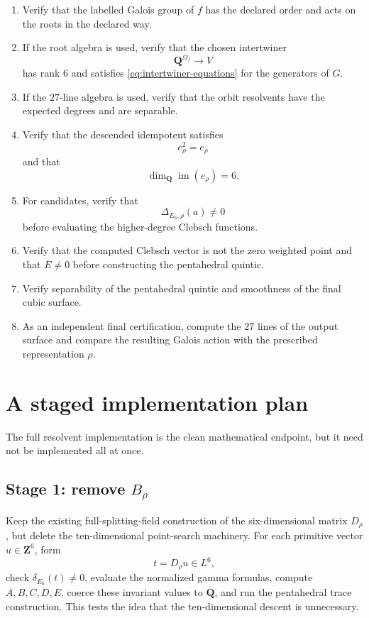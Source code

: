 \documentclass[11pt]{article}
\newcommand{\QQ}{\mathbf{Q}}
\newcommand{\ZZ}{\mathbf{Z}}
\newcommand{\im}{\operatorname{im}}
\newcommand{\deltaE}{\delta_{E_6}}
\begin{document}
\begin{enumerate}
\item Verify that the labelled Galois group of $f$ has the declared order and acts
on the roots in the declared way.

\item If the root algebra is used, verify that the chosen intertwiner
\[
  \QQ^{\Omega_f}\to V
\]
has rank $6$ and satisfies \eqref{eq:intertwiner-equations} for the generators of
$G$.

\item If the $27$-line algebra is used, verify that the orbit resolvents have the
expected degrees and are separable.

\item Verify that the descended idempotent satisfies
\[
  e_\rho^2=e_\rho
\]
and that
\[
  \dim_\QQ\im(e_\rho)=6.
\]

\item For candidates, verify that
\[
  \Delta_{E_6,\rho}(a)\neq0
\]
before evaluating the higher-degree Clebsch functions.

\item Verify that the computed Clebsch vector is not the zero weighted point and
that $E\neq0$ before constructing the pentahedral quintic.

\item Verify separability of the pentahedral quintic and smoothness of the final
cubic surface.

\item As an independent final certification, compute the $27$ lines of the output
surface and compare the resulting Galois action with the prescribed representation
$\rho$.
\end{enumerate}

\section{A staged implementation plan}

The full resolvent implementation is the clean mathematical endpoint, but it need
not be implemented all at once.

\subsection{Stage 1: remove $B_\rho$}

Keep the existing full-splitting-field construction of the six-dimensional matrix
$D_\rho$, but delete the ten-dimensional point-search machinery.  For each
primitive vector $u\in\ZZ^6$, form
\[
  t=D_\rho u\in L^6,
\]
check $\deltaE(t)\neq0$, evaluate the normalized gamma formulas, compute
$A,B,C,D,E$, coerce these invariant values to $\QQ$, and run the pentahedral trace
construction.  This tests the idea that the ten-dimensional descent is unnecessary.
\end{document}

